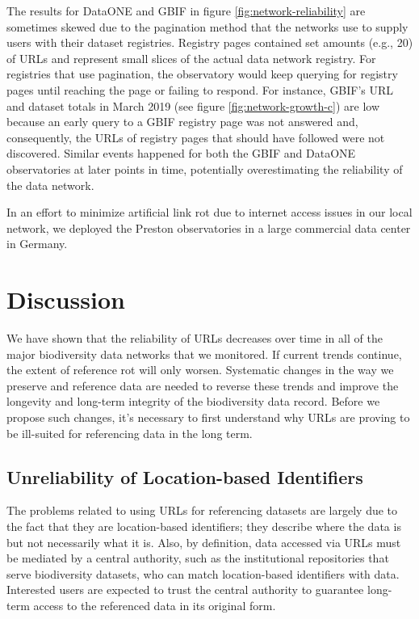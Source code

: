 The results for DataONE and GBIF in figure \ref{fig:network-reliability} are sometimes skewed due to the pagination method that the networks use to supply users with their dataset registries. Registry pages contained set amounts (e.g., 20) of URLs and represent small slices of the actual data network registry. For registries that use pagination, the observatory would keep querying for registry pages until reaching the page or failing to respond. For instance, GBIF's URL and dataset totals in March 2019 (see figure \ref{fig:network-growth-c}) are low because an early query to a GBIF registry page was not answered and, consequently, the URLs of registry pages that should have followed were not discovered. Similar events happened for both the GBIF and DataONE observatories at later points in time, potentially overestimating the reliability of the data network.

In an effort to minimize artificial link rot due to internet access issues in our local network, we deployed the Preston observatories in a large commercial data center in Germany.



\section*{Discussion}
We have shown that the reliability of URLs decreases over time in all of the major biodiversity data networks that we monitored. If current trends continue, the extent of reference rot will only worsen. Systematic changes in the way we preserve and reference data are needed to reverse these trends and improve the longevity and long-term integrity of the biodiversity data record. Before we propose such changes, it's necessary to first understand why URLs are proving to be ill-suited for referencing data in the long term.

\subsection*{Unreliability of Location-based Identifiers}
The problems related to using URLs for referencing datasets are largely due to the fact that they are location-based identifiers; they describe where the data is but not necessarily what it is. Also, by definition, data accessed via URLs must be mediated by a central authority, such as the institutional repositories that serve biodiversity datasets, who can match location-based identifiers with data. Interested users are expected to trust the central authority to guarantee long-term access to the referenced data in its original form.

